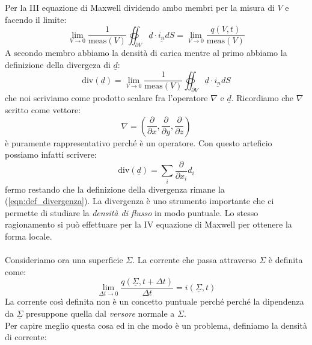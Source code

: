 \documentclass{book}
\begin{document}
        Per la III equazione di Maxwell dividendo ambo membri per la misura di $V$ e facendo il limite:
        \begin{equation}
            \lim_{V \to 0} \frac{1}{\textrm{meas}(V)} \oiint_{\partial V} \underline{d} \cdot \underline{i_{n}} dS = \lim_{V \to 0} \frac{q(V,t)}{\textrm{meas}(V)}
        \end{equation}
        A secondo membro abbiamo la densità di carica mentre al primo abbiamo la definizione della divergeza di $\underline{d}$:
        \begin{equation}
        \label{eqn:def_divergenza}
            \textrm{div}(\underline{d}) = \lim_{V \to 0} \frac{1}{\textrm{meas}(V)} \oiint_{\partial V} \underline{d} \cdot \underline{i_{n}} dS 
        \end{equation}
        che noi scriviamo come prodotto scalare fra l'operatore $\nabla$ e $\underline{d}$. Ricordiamo che $\nabla$ scritto come vettore:
        \begin{equation}
            \nabla = (\frac{\partial }{\partial x}, \frac{\partial }{\partial y}, \frac{\partial }{\partial z})
        \end{equation}
        è puramente rappresentativo perché è un operatore. Con questo arteficio possiamo infatti scrivere:
        \begin{equation}
            \textrm{div}(\underline{d}) = \sum_{i} \frac{\partial}{\partial x_{i}}d_{i}
        \end{equation}
        fermo restando che la definizione della divergenza rimane la (\ref{eqn:def_divergenza}). La divergenza è uno strumento importante che ci permette di studiare la \textit{densità di flusso} in modo puntuale. Lo stesso ragionamento si può effettuare per la IV equazione di Maxwell per ottenere la forma locale.\\ \\
        Consideriamo ora una superficie $\Sigma$. La corrente che passa attraverso $\Sigma$ è definita come:
        \begin{equation}
            \lim_{\Delta t \to 0} \frac{q(\underline{\Sigma}, t + \Delta t)}{\Delta t} = i(\underline{\Sigma}, t)
        \end{equation}
        La corrente così definita non è un concetto puntuale perché perché la dipendenza da $\underline{\Sigma}$ presuppone quella dal \textit{versore} normale a $\Sigma$. \\
        Per capire meglio questa cosa ed in che modo è un problema, definiamo la densità di corrente:
\end{document}
